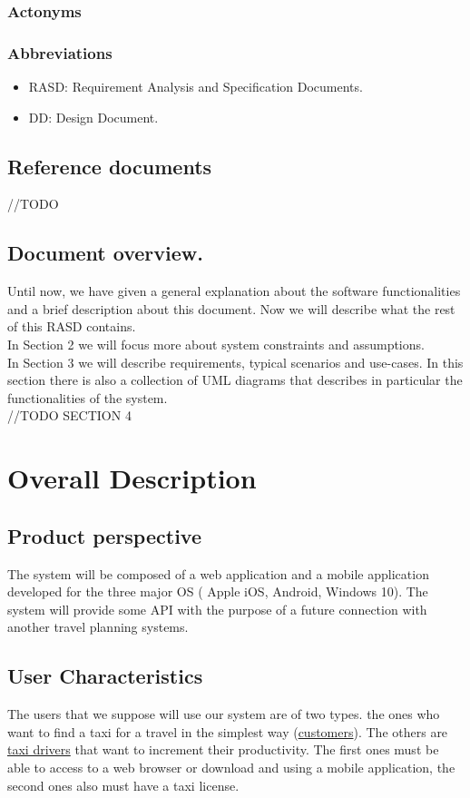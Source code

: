 \documentclass{report}
\begin{document}
		\subsection{Actonyms}

		\subsection{Abbreviations}
		\begin{itemize}
			\item RASD: Requirement Analysis and Specification Documents.
			\item DD: Design Document.
		\end{itemize}
		
	\section{Reference documents}
	//TODO
		
	\section{Document overview.}
	Until now, we have given a general explanation about the software functionalities and a brief description about this document. Now we will describe what the rest of this RASD contains.\\
	In Section 2 we will focus more about system constraints and assumptions.\\
	In Section 3 we will describe requirements, typical scenarios and use-cases. In this section there is also a collection of UML diagrams that describes in particular the functionalities of the system.\\
	//TODO SECTION 4
		
\chapter{Overall Description}
	
	\section{Product perspective}
	The system will be composed of a web application and a mobile application developed for the three major OS ( Apple iOS, Android, Windows 10). The system will provide some API with the purpose of a future connection with another travel planning systems. 
		
	\section{User Characteristics}
	The users that we suppose will use our system are of two types. the ones who want to find a taxi for a travel in the simplest way (\hyperref[sec:customer]{customers}). The others are \hyperref[sec:tdriver]{taxi drivers} that want to increment their productivity. The first ones must be able to access to a web browser or download and using a mobile application, the second ones also must have a taxi license.
		
\end{document}

